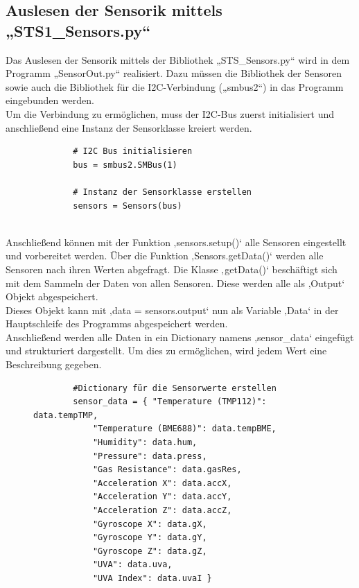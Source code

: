 \subsection{Auslesen der Sensorik mittels „STS1\_Sensors.py“}\label{aus}
Das Auslesen der Sensorik mittels der Bibliothek „STS\_Sensors.py“ wird in dem Programm „SensorOut.py“ realisiert. Dazu müssen die Bibliothek der Sensoren sowie   auch die Bibliothek für die I2C-Verbindung („smbus2“) in das Programm eingebunden werden.\\
\vspace{3mm}
Um die Verbindung zu ermöglichen, muss der I2C-Bus zuerst initialisiert und anschließend eine Instanz der Sensorklasse kreiert werden. 
\vspace{3mm} 
\begin{figure}[H]
	\centering
	\begin{verbatim}
		# I2C Bus initialisieren
		bus = smbus2.SMBus(1)
		
		# Instanz der Sensorklasse erstellen
		sensors = Sensors(bus)
		
	\end{verbatim}
\end{figure}
Anschließend können mit der Funktion ‚sensors.setup()‘ alle Sensoren eingestellt und vorbereitet werden. 
\vspace{3mm} 
Über die Funktion ‚Sensors.getData()‘ werden alle Sensoren nach ihren Werten abgefragt. Die Klasse ‚getData()‘ beschäftigt sich mit dem Sammeln der Daten von allen Sensoren. Diese werden alle als ‚Output‘ Objekt abgespeichert.\\
\vspace{3mm}
Dieses Objekt kann mit ‚data = sensors.output‘ nun als Variable ‚Data‘ in der Hauptschleife des Programms abgespeichert werden. \\
\vspace{3mm}
Anschließend werden alle Daten in ein Dictionary namens ‚sensor\_data‘ eingefügt und strukturiert dargestellt. Um dies zu ermöglichen, wird jedem Wert eine Beschreibung gegeben. 
\vspace{3mm}
\begin{figure}[H]
	\centering
	\begin{verbatim}
		#Dictionary für die Sensorwerte erstellen
		sensor_data = { "Temperature (TMP112)": data.tempTMP, 
			"Temperature (BME688)": data.tempBME, 
			"Humidity": data.hum, 
			"Pressure": data.press,
			"Gas Resistance": data.gasRes, 
			"Acceleration X": data.accX, 
			"Acceleration Y": data.accY, 
			"Acceleration Z": data.accZ,
			"Gyroscope X": data.gX, 
			"Gyroscope Y": data.gY, 
			"Gyroscope Z": data.gZ, 
			"UVA": data.uva, 
			"UVA Index": data.uvaI }
		
	\end{verbatim}
\end{figure}
